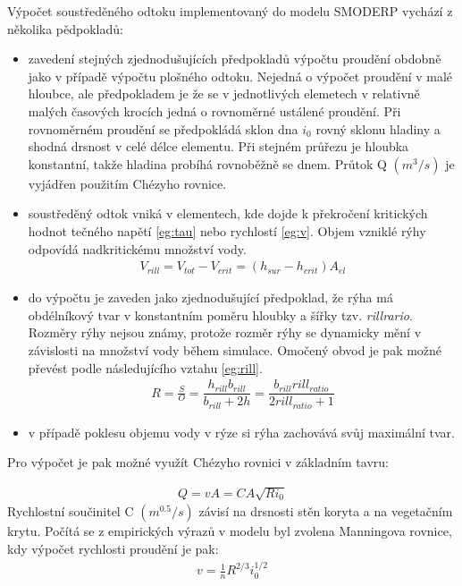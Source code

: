 \documentclass[a4paper, 12pt, twoside]{article}
\begin{document}
Výpočet soustředěného odtoku implementovaný do modelu SMODERP vychází z několika pědpokladů:
\begin{itemize}
\item zavedení stejných zjednodušujících předpokladů výpočtu proudění obdobně jako v případě výpočtu plošného odtoku. Nejedná o výpočet proudění v malé hloubce, ale předpokladem je že se v jednotlivých elemetech v relativně malých časových krocích jedná o rovnoměrné ustálené proudění. Při rovnoměrném proudění se předpokládá sklon dna $i_{0}$ rovný sklonu hladiny a shodná drsnost v celé délce elementu. Při stejném průřezu je hloubka konstantní, takže hladina probíhá rovnoběžně se dnem. Průtok Q $(m^{3}/s)$ je vyjádřen použitím Chézyho rovnice.
\item soustředěný odtok vniká v elementech, kde dojde k překročení kritických hodnot tečného napětí \ref{eg:tau} nebo rychlostí \ref{eg:v}. Objem vzniklé rýhy odpovídá nadkritickému množství vody.
\begin{eqnarray}
V_{rill}= V_{tot} - V_{crit} = (h_{sur} - h_{crit}) A_{el}
\end{eqnarray}

\item do výpočtu je zaveden jako zjednodušující předpoklad, že rýha má obdélníkový tvar v konstantním poměru hloubky a šířky tzv. \textit{rillrario}. Rozměry rýhy nejsou známy, protože rozměr rýhy se dynamicky mění v závislosti na množství vody během simulace.  Omočený obvod je pak možné převést podle následujícího vztahu \ref{eg:rill}. \\
\begin{eqnarray} \label{eg:rill}
R = \frac{S}{O} = \dfrac{h_{rill}b_{rill}}{b_{rill}+2h} = \dfrac{b_{rill}rill_{ratio}}{2rill_{ratio}+1}
\end{eqnarray}

\item v případě poklesu objemu vody v rýze si rýha zachovává svůj maximální tvar.
\end{itemize}

Pro výpočet je pak možné využít Chézyho rovnici v základním tavru:

\begin{eqnarray}\label{eq:chez}
Q = v A = C A \sqrt{Ri_{0}} 
\end{eqnarray} 
Rychlostní součinitel C $(m^{0.5}/s)$  závisí na drsnosti stěn koryta a na vegetačním krytu. Počítá se z empirických výrazů v modelu byl zvolena Manningova rovnice, kdy výpočet rychlosti proudění je pak:
\begin{eqnarray}
v = \frac{1}{n} R^{2/3} i_{0}^{1/2} 
\end{eqnarray} 
\end{document}
